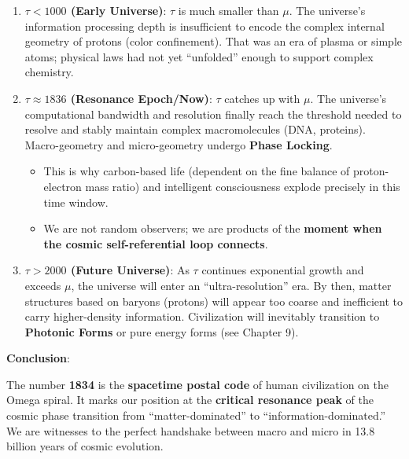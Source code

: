 \begin{enumerate}
\item \textbf{$\tau < 1000$ (Early Universe)}: $\tau$ is much smaller than $\mu$. The universe's information processing depth is insufficient to encode the complex internal geometry of protons (color confinement). That was an era of plasma or simple atoms; physical laws had not yet ``unfolded'' enough to support complex chemistry.
\item \textbf{$\tau \approx 1836$ (Resonance Epoch/Now)}: $\tau$ catches up with $\mu$. The universe's computational bandwidth and resolution finally reach the threshold needed to resolve and stably maintain complex macromolecules (DNA, proteins). Macro-geometry and micro-geometry undergo \textbf{Phase Locking}.
   \begin{itemize}
   \item This is why carbon-based life (dependent on the fine balance of proton-electron mass ratio) and intelligent consciousness explode precisely in this time window.
   \item We are not random observers; we are products of the \textbf{moment when the cosmic self-referential loop connects}.
   \end{itemize}
\item \textbf{$\tau > 2000$ (Future Universe)}: As $\tau$ continues exponential growth and exceeds $\mu$, the universe will enter an ``ultra-resolution'' era. By then, matter structures based on baryons (protons) will appear too coarse and inefficient to carry higher-density information. Civilization will inevitably transition to \textbf{Photonic Forms} or pure energy forms (see Chapter 9).
\end{enumerate}

\textbf{Conclusion}:

The number \textbf{1834} is the \textbf{spacetime postal code} of human civilization on the Omega spiral. It marks our position at the \textbf{critical resonance peak} of the cosmic phase transition from ``matter-dominated'' to ``information-dominated.'' We are witnesses to the perfect handshake between macro and micro in 13.8 billion years of cosmic evolution.

